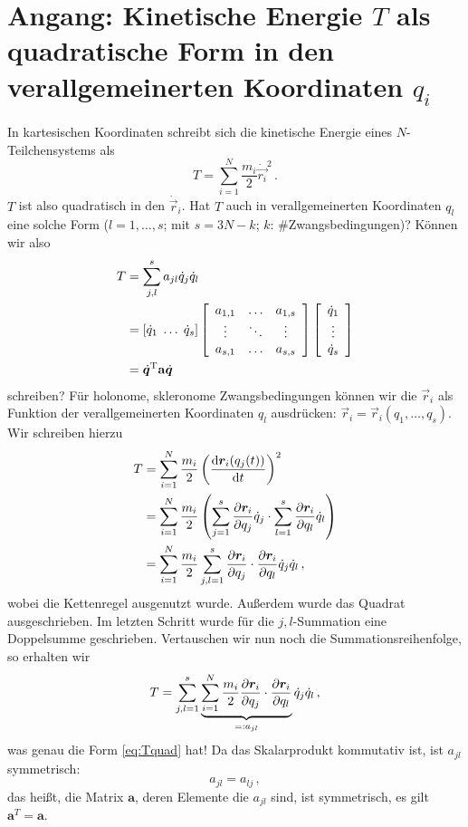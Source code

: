 \documentclass[paper=a4, fontsize=11.0pt, abstractoff, DIV12]{scrartcl}
\begin{document}




\section*{Angang: Kinetische Energie $T$ als quadratische Form in den verallgemeinerten Koordinaten $q_i$}

In kartesischen Koordinaten schreibt sich die kinetische Energie eines
$N$-Teilchensystems als
\begin{equation}
T = \sum\limits_{i=1}^{N} \frac{m_i}{2} \dot{\vec{r_i}}^2 \, .
\end{equation}
$T$ ist also quadratisch in den $\dot{\vec r}_i$. Hat $T$ auch in
verallgemeinerten Koordinaten $q_l$ eine solche Form ($l=1,\dots,s$; mit $s=3N-k$; $k$:
\#Zwangsbedingungen)? Können wir also
\begin{align}
T &= \sum\limits_{j,l}^{s} a_{jl} \dot{q}_j \dot{q}_l\nonumber\\
&= \left[ \dot{q}_1\; \dots\;\dot{q}_{s} \right] \threeMatrix{a_{1,1}}{\dots}{a_{1,s}}{\vdots}{\ddots}{\vdots}{a_{s,1}}{\dots}{a_{s, s}}
\DreierVec{\dot{q}_{1}}{\vdots}{\dot{q}_{s}}\nonumber\\
&= \dot{\vec{q}}^\mathrm{T} \mathbf{a} \dot{\vec{q}}
\label{eq:Tquad}
\end{align}
schreiben? Für holonome, skleronome Zwangsbedingungen können wir die $\vec r_i$
als Funktion der verallgemeinerten Koordinaten $q_l$ ausdrücken:
$\vec r_i = \vec r_i(q_1, \dots, q_{s})$. Wir schreiben hierzu
\begin{align}
T &=  \sum\limits_{i=1}^{N} \frac{m_i}{2} \left(\frac{\mathrm{d}{\boldsymbol{r}}_i(q_j(t))}{\mathrm{d}t}\right)^2\nonumber\\
&= \sum\limits_{i=1}^{N} \frac{m_i}{2} \left( \sum\limits_{j=1}^{s} \frac{\partial {\ensuremath{\boldsymbol{r}}}_i}{\partial q_j}\dot{q}_j \cdot  \sum\limits_{l=1}^{s} \frac{\partial {\ensuremath{\boldsymbol{r}}}_i}{\partial q_l}\dot{q}_l \right)\nonumber\\
&= \sum\limits_{i=1}^{N} \frac{m_i}{2} \sum\limits_{j,l=1}^{s} \frac{\partial {\ensuremath{\boldsymbol{r}}}_i}{\partial q_j} \cdot \frac{\partial {\ensuremath{\boldsymbol{r}}}_i}{\partial q_l}\dot{q}_j \dot{q}_l \, ,
\end{align}
wobei die Kettenregel ausgenutzt wurde. Außerdem wurde das Quadrat
ausgeschrieben. Im letzten Schritt wurde für die $j,l$-Summation eine
Doppelsumme geschrieben. Vertauschen wir nun noch die Summationsreihenfolge,
so erhalten wir
\begin{equation}
T = \sum\limits_{j,l=1}^{s} \underbrace{\sum\limits_{i=1}^{N} \frac{m_i}{2} \frac{\partial {\ensuremath{\boldsymbol{r}}}_i}{\partial q_j} \cdot \frac{\partial {\ensuremath{\boldsymbol{r}}}_i}{\partial q_l}}_{=:a_{jl}} \dot{q}_j \dot{q}_l \, ,
\end{equation}
was genau die Form \eqref{eq:Tquad} hat! Da das Skalarprodukt kommutativ ist,
ist $a_{jl}$ symmetrisch:
\begin{equation}
a_{jl} = a_{lj}\, ,
\end{equation}
das heißt, die Matrix $\mathbf{a}$, deren Elemente die $a_{jl}$ sind, ist
symmetrisch, es gilt $\mathbf{a}^{T} = \mathbf{a}$.
\end{document}
